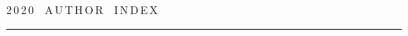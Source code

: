 

\def\leftfootline{\small{\textbf{\thepage}


\hfill СИСТЕМЫ И СРЕДСТВА ИНФОРМАТИКИ\ \ \ выпуск~30\ \ \ №~4\ \ \ 2020}


}%


 \def\rightfootline{\small{СИСТЕМЫ И СРЕДСТВА ИНФОРМАТИКИ\ \ \ выпуск~30\ \ \


№~4\ \ \ 2020


 \hfill \textbf{\thepage}}}


 \label{end\stat}





\newpage





\def\stat{cont-e}


{%




\raggedleft\Large \bf%


2\,0\,2\,0\ \ A\,U\,T\,H\,O\,R\ \ I\,N\,D\,E\,X \vskip 17pt


 \hrule


 \par




 }





\label{st\stat}

















\def\leftkol{\ } %


\def\rightkol{\ } %















